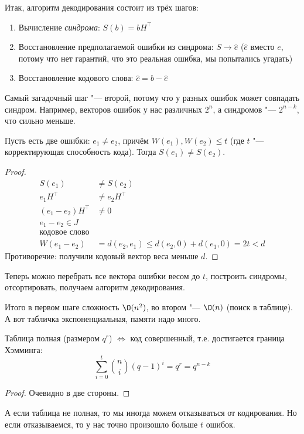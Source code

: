 Итак, алгоритм декодирования состоит из трёх шагов:

\begin{enumerate}
\item
	Вычисление \textit{синдрома}: $S(b)=bH^\top$
\item
	Восстановление предполагаемой ошибки из синдрома: $S \to \hat e$
	($\hat e$ вместо $e$, потому что нет гарантий, что это
	реальная ошибка, мы попытались угадать)
\item
	Восстановление кодового слова: $\hat c = b - \hat e$
\end{enumerate}

Самый загадочный шаг "--- второй, потому что у разных ошибок может совпадать синдром.
Например, векторов ошибок у нас различных $2^n$, а синдромов "--- $2^{n-k}$, что сильно меньше.

\begin{theorem}
	Пусть есть две ошибки: $e_1\neq e_2$, причём
	$W(e_1), W(e_2) \le t$ (где $t$ "--- корректирующая способность кода).
	Тогда $S(e_1) \neq S(e_2)$.
\end{theorem}
\begin{proof}
	\begin{align*}
	S(e_1) &\neq S(e_2) \\
	e_1H^\top &\neq e_2H^\top \\
	(e_1-e_2)H^\top &\neq 0 \\
	e_1 - e_2 \in J \\ \text{кодовое слово} \\
	W(e_1 - e_2) &= d(e_2, e_1) \le d(e_2, 0) + d(e_1, 0) = 2t < d
	\end{align*}
	Противоречие: получили кодовый вектор веса меньше $d$.
\end{proof}

Теперь можно перебрать все вектора ошибки весом до $t$,
построить синдромы, отсортировать, получаем алгоритм декодирования.

Итого в первом шаге сложность $\O(n^2)$, во втором "--- $\O(n)$ (поиск в таблице).
А вот табличка экспоненциальная, памяти надо много.

\begin{Rem}
	Таблица полная (размером $q^r$) $\iff$ код совершенный,
	т.е. достигается граница Хэмминга:
	\[
		\sum_{i=0}^t \binom{n}{i} (q-1)^i = q^r = q^{n-k}
	\]
\end{Rem}
\begin{proof}
	Очевидно в две стороны. \TODO
\end{proof}
\begin{Rem}
	А если таблица не полная, то мы иногда можем отказываться
	от кодирования.
	Но если отказываемся, то у нас точно произошло больше $t$ ошибок.
\end{Rem}

